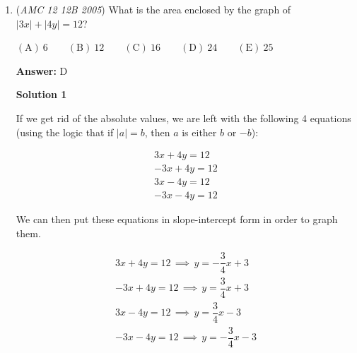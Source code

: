 \begin{enumerate}
 



\textbf{Solution 2 (Trig)}

After drawing out a diagram, let $\angle{ABC}=\theta$. By the Law of Cosines, $7^2=2^2+7^2-2(7)(2)\cos{\theta} \rightarrow 0=4-28\cos{\theta} \rightarrow \cos{\theta}=\frac{1}{7}$. In $\triangle CBD$, we have $\angle{CBD}=(180-\theta)$, and using the identity $\cos(180-\theta)=-\cos{\theta}$ and Law of Cosines one more time: $8^2=7^2+x^2-2(7)(x)\left( \frac{-1}{7} \right) \rightarrow 64=49+x^2+2x \rightarrow x^2+2x-15=0$. The only positive value for $x$ is $3$, which gives the length of $\overline{BD}$. Thus the answer is $\boxed{\textbf{(A) }3}$.

 



\textbf{Solution 3 (Stewart's Theorem)}

Let $BD=k$. Then, by \href{https://artofproblemsolving.com/wiki/index.php?title=Stewart\%27s\_Theorem}{Stewart's Theorem}, 

 $2k(2+k)+7^2(2+k)=7^2k+8^2\cdot 2 \implies k^2+2k-15=0 \implies k=\boxed{\textbf{(A) }3}$



	\item (\textit{AMC 12 12B 2005}) What is the area enclosed by the graph of $|3x|+|4y|=12$?


 $\mathrm{(A)}\ 6      \qquad \mathrm{(B)}\ 12      \qquad \mathrm{(C)}\ 16      \qquad \mathrm{(D)}\ 24      \qquad \mathrm{(E)}\ 25$

 \textbf{Answer: }D



\textbf{Solution 1}

If we get rid of the absolute values, we are left with the following 4 equations (using the logic that if $|a|=b$, then $a$ is either $b$ or $-b$):

 
 \begin{align*} 3x+4y=12 \\ -3x+4y=12 \\ 3x-4y=12 \\ -3x-4y=12 \end{align*}


 We can then put these equations in slope-intercept form in order to graph them.

 
 \begin{align*} 3x+4y=12 \,\implies\, y=-\dfrac{3}{4}x+3\\ -3x+4y=12\,\implies\, y=\dfrac{3}{4}x+3\\ 3x-4y=12\,\implies\, y=\dfrac{3}{4}x-3\\ -3x-4y=12\,\implies\, y=-\dfrac{3}{4}x-3\end{align*}



\end{enumerate}
